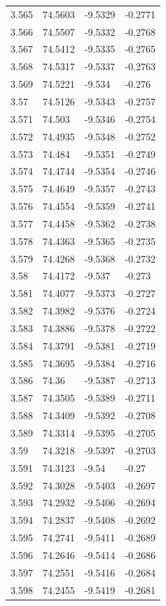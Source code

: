 \begin{tabular}{llll}
3.565 & 74.5603 & -9.5329 & -0.2771 \\
3.566 & 74.5507 & -9.5332 & -0.2768 \\
3.567 & 74.5412 & -9.5335 & -0.2765 \\
3.568 & 74.5317 & -9.5337 & -0.2763 \\
3.569 & 74.5221 & -9.534 & -0.276 \\
3.57 & 74.5126 & -9.5343 & -0.2757 \\
3.571 & 74.503 & -9.5346 & -0.2754 \\
3.572 & 74.4935 & -9.5348 & -0.2752 \\
3.573 & 74.484 & -9.5351 & -0.2749 \\
3.574 & 74.4744 & -9.5354 & -0.2746 \\
3.575 & 74.4649 & -9.5357 & -0.2743 \\
3.576 & 74.4554 & -9.5359 & -0.2741 \\
3.577 & 74.4458 & -9.5362 & -0.2738 \\
3.578 & 74.4363 & -9.5365 & -0.2735 \\
3.579 & 74.4268 & -9.5368 & -0.2732 \\
3.58 & 74.4172 & -9.537 & -0.273 \\
3.581 & 74.4077 & -9.5373 & -0.2727 \\
3.582 & 74.3982 & -9.5376 & -0.2724 \\
3.583 & 74.3886 & -9.5378 & -0.2722 \\
3.584 & 74.3791 & -9.5381 & -0.2719 \\
3.585 & 74.3695 & -9.5384 & -0.2716 \\
3.586 & 74.36 & -9.5387 & -0.2713 \\
3.587 & 74.3505 & -9.5389 & -0.2711 \\
3.588 & 74.3409 & -9.5392 & -0.2708 \\
3.589 & 74.3314 & -9.5395 & -0.2705 \\
3.59 & 74.3218 & -9.5397 & -0.2703 \\
3.591 & 74.3123 & -9.54 & -0.27 \\
3.592 & 74.3028 & -9.5403 & -0.2697 \\
3.593 & 74.2932 & -9.5406 & -0.2694 \\
3.594 & 74.2837 & -9.5408 & -0.2692 \\
3.595 & 74.2741 & -9.5411 & -0.2689 \\
3.596 & 74.2646 & -9.5414 & -0.2686 \\
3.597 & 74.2551 & -9.5416 & -0.2684 \\
3.598 & 74.2455 & -9.5419 & -0.2681 \\

\end{tabular}
